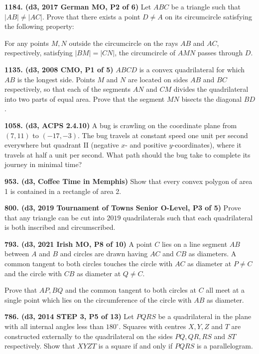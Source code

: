 \documentclass{article}
\begin{document}
\textbf{1184. (\color{red}d3\color{black}, 2017 German MO, P2 of 6)} Let $ABC$ be a triangle such that $\vert AB\vert \ne \vert AC\vert$. Prove that there exists a point $D \ne A$ on its circumcircle satisfying the following property:

For any points $M, N$ outside the circumcircle on the rays $AB$ and $AC$, respectively, satisfying $\vert BM\vert=\vert CN\vert$, the circumcircle of $AMN$ passes through $D$.

\textbf{1135. (\color{red}d3\color{black}, 2008 CMO, P1 of 5)} $ABCD$ is a convex quadrilateral for which $AB$ is the longest side. Points $M$ and $N$ are located on sides $AB$ and $BC$ respectively, so that each of the segments $AN$ and $CM$ divides the quadrilateral into two parts of equal area. Prove that the segment $MN$ bisects the diagonal $BD$.

\textbf{1058. (\color{red}d3\color{black}, ACPS 2.4.10)} A bug is crawling on the coordinate plane from \((7,11)\) to \((-17,-3)\). The bug travels at constant speed one unit per second everywhere but quadrant II (neg­ative \(x\)- and positive \(y\)-coordinates), where it travels at half a unit per second. What path should the bug take to complete its journey in minimal time?

\textbf{953. (\color{red}d3\color{black}, Coffee Time in Memphis)} Show that every convex polygon of area 1 is contained in a rectangle of area 2.

\textbf{800. (\color{red}d3\color{black}, 2019 Tournament of Towns Senior O-Level, P3 of 5)} Prove that any triangle can be cut into $2019$ quadrilaterals such that each quadrilateral is both inscribed and circumscribed.

\textbf{793. (\color{red}d3\color{black}, 2021 Irish MO, P8 of 10)} A point $C$ lies on a line segment $A B$ between $A$ and $B$ and circles are drawn having $A C$ and $C B$ as diameters. A common tangent to both circles touches the circle with $A C$ as diameter at $P \neq C$ and the circle with $C B$ as diameter at $Q \neq C$.

Prove that $A P, B Q$ and the common tangent to both circles at $C$ all meet at a single point which lies on the circumference of the circle with $A B$ as diameter.

\textbf{786. (\color{red}d3\color{black}, 2014 STEP 3, P5 of 13)} Let $PQRS$ be a quadrilateral in the plane with all internal angles less than $180^{\circ}.$ Squares with centres $X, Y, Z$ and $T$ are constructed externally to the quadrilateral on the sides $PQ, QR, RS$ and $ST$ respectively. Show that $XYZT$ is a square if and only if $PQRS$ is a parallelogram.
\end{document}
